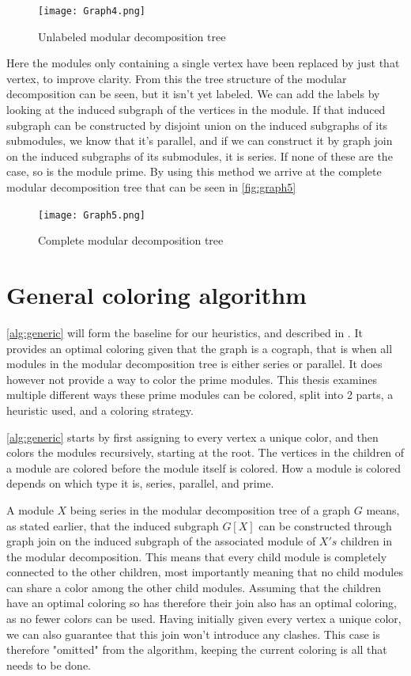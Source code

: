 \documentclass[a4paper]{article}
\begin{document}
\begin{figure}[H]
    \texttt{[image: Graph4.png]}
    \caption{Unlabeled modular decomposition tree}
    \label{fig:graph4}
\end{figure}

Here the modules only containing a single vertex have been replaced by just that
vertex, to improve clarity. From this the tree structure of the modular
decomposition can be seen, but it isn't yet labeled. We can add the labels by 
looking at the induced subgraph of the vertices in the module. If that induced
subgraph can be constructed by disjoint union on the induced subgraphs of its
submodules, we know that it's parallel, and if we can construct it by graph join on
the induced subgraphs of its submodules, it is series. If none of these are
the case, so is the module prime. By using this method we arrive at the complete
modular decomposition tree that can be seen in \autoref{fig:graph5}

\begin{figure}[h!]
    \texttt{[image: Graph5.png]}
    \caption{Complete modular decomposition tree}
    \label{fig:graph5}
\end{figure}

\FloatBarrier

\section{General coloring algorithm}

\autoref{alg:generic} will form the baseline for our heuristics, and described in
\cite{HCL}. It provides an optimal coloring given that the graph is a cograph,
that is when all modules in the modular decomposition tree is either series or
parallel.  It does however not provide a way to color the prime modules. This
thesis examines multiple different ways these prime modules can be colored, split
into 2 parts, a heuristic used, and a coloring strategy. 

\autoref{alg:generic} starts by first assigning to every vertex a unique color,
and then colors the modules recursively, starting at the root. The vertices in
the children of a module are colored before the module itself is colored. How a
module is colored depends on which type it is, series, parallel, and prime.

A module $X$ being series in the modular decomposition tree of a graph $G$
means, as stated earlier, that the induced subgraph $G[X]$ can be constructed
through graph join on the induced subgraph of the associated module of $X's$
children in the modular decomposition. This means that every child module is
completely connected to the other children, most importantly meaning that no
child modules can share a color among the other child modules. Assuming that
the children have an optimal coloring so has therefore their join also has an optimal
coloring, as no fewer colors can be used. Having initially given every vertex a
unique color, we can also guarantee that this join won't introduce any clashes.
This case is therefore "omitted" from the algorithm, keeping
the current coloring is all that needs to be done.
\end{document}

